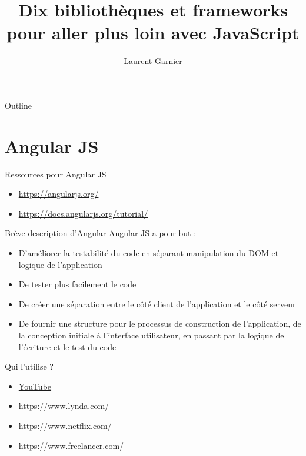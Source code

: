 \documentclass[presentation]{beamer}
\author{Laurent Garnier}
\date{}
\title{Dix bibliothèques et frameworks pour aller plus loin avec JavaScript}
\begin{document}
\maketitle
\begin{frame}{Outline}
\tableofcontents
\end{frame}


\section{Angular JS}
\label{sec:org8211a96}

\begin{frame}[label={sec:orga8d9219}]{Ressources pour Angular JS}
\begin{itemize}
\item \url{https://angularjs.org/}
\item \url{https://docs.angularjs.org/tutorial/}
\end{itemize}
\end{frame}

\begin{frame}[label={sec:orgbd7e6d3}]{Brève description d'Angular}
Angular JS a pour but :

\begin{itemize}
\item D'améliorer la testabilité du code en séparant manipulation du DOM
et logique de l'application
\item De tester plus facilement le code
\item De créer une séparation entre le côté client de l'application et
le côté serveur
\item De fournir une structure pour le processus de construction de
l'application, de la conception initiale à l'interface
utilisateur, en passant par la logique de l'écriture et le test du
code
\end{itemize}
\end{frame}

\begin{frame}[label={sec:org1c08fcf}]{Qui l'utilise ?}
\begin{itemize}
\item \href{https://www.youtube.com/channel/UC0-\_4-vctZIzlTRWnIqGfOA?view\_as=subscriber}{YouTube}
\item \url{https://www.lynda.com/}
\item \url{https://www.netflix.com/}
\item \url{https://www.freelancer.com/}
\end{itemize}
\end{frame}
\end{document}
